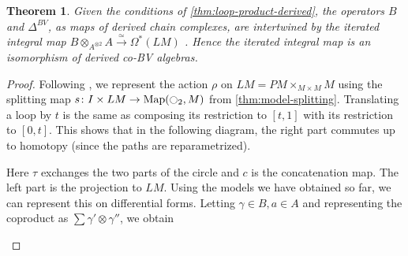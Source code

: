 \documentclass{scrartcl}
\theoremstyle{plain}
\newtheorem{theorem}{Theorem}[section]
\theoremstyle{definition}
\newcommand{\quiso}{\simeq}
\let\xto\xrightarrow
\DeclareMathOperator{\Map}{Map}
\begin{document}
\begin{theorem}\label{thm:bv-iso}
    Given the conditions of \cref{thm:loop-product-derived}, the operators $B$ and $\Delta^{BV}$, as maps of derived chain complexes, are intertwined by the iterated integral map $B\otimes_{A^{\otimes 2}} A \xto{\quiso}\Omega^*(LM)$ . Hence the iterated integral map is an isomorphism of derived co-BV algebras. 
\end{theorem}

\begin{proof}
Following \cite{naef2019string}, we represent the action $\rho$ on $LM = PM\times_{M\times M} M$ using the splitting map $s\colon I \times LM\to\Map(\ocircle_2, M)$ from \cref{thm:model-splitting}. Translating a loop by $t$ is the same as composing its restriction to $[t, 1]$ with its restriction to $[0, t]$. This shows that in the following diagram, the right part commutes up to homotopy (since the paths are reparametrized).

\begin{center}
\end{center}
Here $\tau$ exchanges the two parts of the circle and $c$ is the concatenation map. The left part is the projection to $LM$. Using the models we have obtained so far, we can represent this on differential forms. Letting $\gamma\in B, a\in A$ and representing the coproduct as $\sum \gamma'\otimes\gamma''$, we obtain 

\begin{center}
\end{center}


\end{proof}
\end{document}
